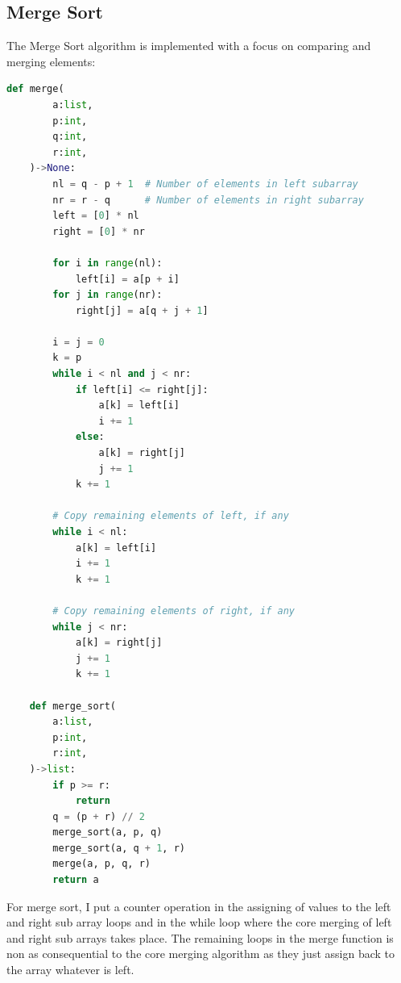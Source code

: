 \documentclass{article}
\begin{document}
\subsection{Merge Sort}
The Merge Sort algorithm is implemented with a focus on comparing and merging elements:
\begin{lstlisting}[language=Python]
    def merge(
        a:list, 
        p:int, 
        q:int, 
        r:int,
    )->None:
        nl = q - p + 1  # Number of elements in left subarray
        nr = r - q      # Number of elements in right subarray
        left = [0] * nl
        right = [0] * nr
    
        for i in range(nl):
            left[i] = a[p + i]
        for j in range(nr):
            right[j] = a[q + j + 1]
    
        i = j = 0
        k = p
        while i < nl and j < nr:
            if left[i] <= right[j]:
                a[k] = left[i]
                i += 1
            else:
                a[k] = right[j]
                j += 1
            k += 1
    
        # Copy remaining elements of left, if any
        while i < nl:
            a[k] = left[i]
            i += 1
            k += 1
    
        # Copy remaining elements of right, if any
        while j < nr:
            a[k] = right[j]
            j += 1
            k += 1
    
    def merge_sort(
        a:list, 
        p:int, 
        r:int,
    )->list:
        if p >= r:
            return
        q = (p + r) // 2
        merge_sort(a, p, q)
        merge_sort(a, q + 1, r)
        merge(a, p, q, r)
        return a
\end{lstlisting}

For merge sort, I put a counter operation in the assigning of values to the left and right sub array loops and in the while loop where the core merging of left and right sub arrays takes place. The remaining loops in the merge function is non as consequential to the core merging algorithm as they just assign back to the array whatever is left.
\end{document}
